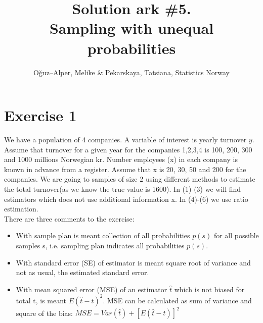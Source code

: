 \documentclass[12pt]{article}
\begin{document}
\title{Solution ark \#5.\\ Sampling with unequal probabilities}
\author{O\u{g}uz--Alper, Melike \& Pekarskaya, Tatsiana, Statistics Norway}
\maketitle

\section*{Exercise 1}
We have a population of 4 companies. A variable of interest is yearly turnover $y$. Assume that turnover for a given year for the companies 1,2,3,4 is 100, 200, 300 and 1000 millions Norwegian kr. Number employees (x) in each company is known in advance from a register. Assume that x is 20, 30, 50 and 200 for the companies. We are going to samples of size 2 using different methods to estimate the total turnover(as we know the true value is 1600). In (1)-(3) we will find estimators which does not use additional information x. In (4)-(6) we use ratio estimation.\\
There are three comments to the exercise:
\begin{itemize}
\item With sample plan is meant collection of all probabilities $p(s)$ for all possible samples s, i.e. sampling plan indicates all probabilities $p(s)$.
\item With standard error (SE) of estimator is meant square root of variance and not as usual, the estimated standard error.
\item With mean squared error (MSE) of an estimator $\hat{t}$ which is not biased for total t, is meant $E(\hat{t} - t)^2$. MSE can be calculated as sum of variance and square of the bias: $MSE = Var(\hat{t})+[E(\hat{t} - t)]^2$
\end{itemize}
\end{document}
